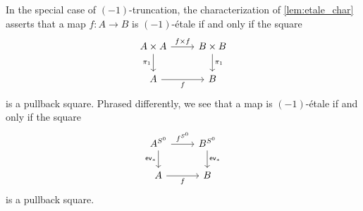 \documentclass[9pt,twosided]{amsart}
\begin{document}
\begin{comment}%
\begin{cor}
If $f:A\to B$ is $\modal$-\'etale, then the square
\begin{equation*}
\begin{tikzcd}[column sep=large]
A \arrow[d,swap,"\delta_{\modalunit}"] \arrow[r,"f"] & B \arrow[d,"\delta_{\modalunit}"] \\
A\times_{\modal A} A \arrow[r,swap,"f\times_{\modal f}f"] & B\times_{\modal B} B
\end{tikzcd}
\end{equation*}
is a pullback square.
\end{cor}

\begin{proof}
Consider the diagram
\begin{equation*}
\begin{tikzcd}[column sep=large]
A \arrow[d,swap,"\delta_{\modalunit}"] \arrow[r,"f"] & B \arrow[d,"\delta_{\modalunit}"] \\
A\times_{\modal A} A \arrow[d,swap,"\pi_1"] \arrow[r,"{f\times_{\modal f} f}"] & B\times_{\modal B} B \arrow[d,"\pi_1"] \\
A \arrow[r,"f"] & B
\end{tikzcd}
\end{equation*}
The bottom square is a pullback square by \cref{lem:etale_char}, and the outer rectangle is a pullback since both vertical composites are homotopic to the respective identity functions. Therefore the top square is a pullback.
\end{proof}
\end{comment}

\begin{rmk}\label{rmk:-1etale}
In the special case of $(-1)$-truncation, the characterization of \cref{lem:etale_char} asserts that a map $f:A\to B$ is $(-1)$-\'etale if and only if the square
\begin{equation*}
\begin{tikzcd}
A\times A \arrow[d,swap,"\pi_1"] \arrow[r,"{f\times f}"] & B\times B \arrow[d,"\pi_1"] \\
A \arrow[r,swap,"f"] & B
\end{tikzcd}
\end{equation*}
is a pullback square. Phrased differently, we see that a map is $(-1)$-\'etale if and only if the square
\begin{equation*}
\begin{tikzcd}
A^{\sphere{0}} \arrow[d,swap,"\mathsf{ev}_\ast"] \arrow[r,"f^{\sphere{0}}"] & B^{\sphere{0}} \arrow[d,"\mathsf{ev}_\ast"] \\
A \arrow[r,swap,"f"] & B
\end{tikzcd}
\end{equation*}
is a pullback square.
\end{rmk}
\end{document}
